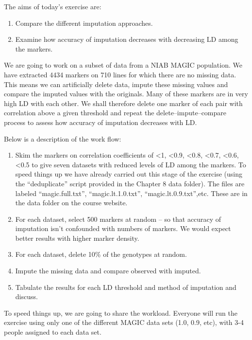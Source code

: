 \documentclass[
]{book}
\begin{document}
The aims of today's exercise are:

\begin{enumerate}
\def\labelenumi{\arabic{enumi}.}
\item
  Compare the different imputation approaches.
\item
  Examine how accuracy of imputation decreases with decreasing LD among the markers.
\end{enumerate}

We are going to work on a subset of data from a NIAB MAGIC population. We have extracted 4434 markers on 710 lines for which there are no missing data. This means we can artificially delete data, impute these missing values and compare the imputed values with the originals. Many of these markers are in very high LD with each other. We shall therefore delete one marker of each pair with correlation above a given threshold and repeat the delete--impute--compare process to assess how accuracy of imputation decreases with LD.

Below is a description of the work flow:

\begin{enumerate}
\def\labelenumi{\arabic{enumi}.}
\item
  Skim the markers on correlation coefficients of \textless1, \textless0.9, \textless0.8, \textless0.7, \textless0.6, \textless0.5 to give seven datasets with reduced levels of LD among the markers. To speed things up we have already carried out this stage of the exercise (using the ``deduplicate'' script provided in the Chapter 8 data folder). The files are labeled ``magic.full.txt'', ``magic.lt.1.0.txt'', ``magic.lt.0.9.txt'',etc. These are in the data folder on the course website.
\item
  For each dataset, select 500 markers at random -- so that accuracy of imputation isn't confounded with numbers of markers. We would expect better results with higher marker density.
\item
  For each dataset, delete 10\% of the genotypes at random.
\item
  Impute the missing data and compare observed with imputed.
\item
  Tabulate the results for each LD threshold and method of imputation and discuss.
\end{enumerate}

To speed things up, we are going to share the workload. Everyone will run the exercise using only one of the different MAGIC data sets (1.0, 0.9, etc), with 3-4 people assigned to each data set.
\end{document}
